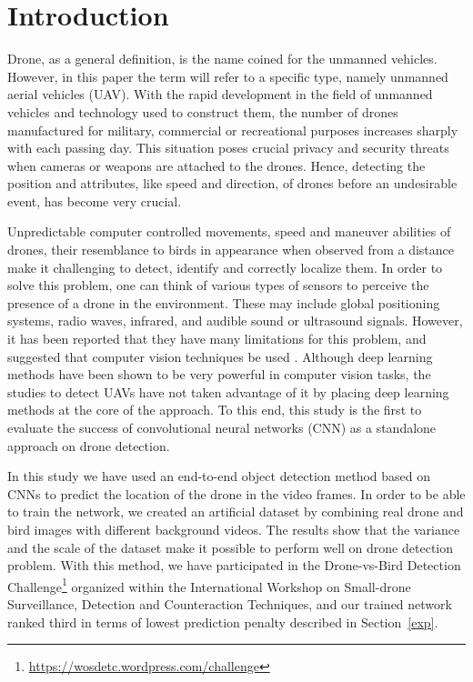 \documentclass[10pt,twocolumn,letterpaper]{article}
\begin{document}
\section{Introduction}
Drone, as a general definition, is the name coined for the unmanned vehicles. However, in this paper the term will refer to a specific type, namely unmanned aerial vehicles (UAV). With the rapid development in the field of unmanned vehicles and technology used to construct them, the number of drones manufactured for military, commercial or recreational purposes increases sharply with each passing day. This situation poses crucial privacy and security threats when cameras or weapons are attached to the drones. Hence, detecting the position and attributes, like speed and direction, of drones before an undesirable event, has become very crucial.
\par
Unpredictable computer controlled movements, speed and maneuver abilities of drones, their resemblance to birds in appearance when observed from a distance make it challenging to detect, identify and correctly localize them. In order to solve this problem, one can think of various types of sensors to perceive the presence of a drone in the environment. These may include global positioning systems, radio waves, infrared, and audible sound or ultrasound signals. However, it has been reported that they have many limitations for this problem, and suggested that computer vision techniques be used \cite{gokcce2015vision}. Although deep learning methods have been shown to be very powerful in computer vision tasks, the studies to detect UAVs have not taken advantage of it by placing deep learning methods at the core of the approach. To this end, this study is the first to evaluate the success of convolutional neural networks (CNN) as a standalone approach on drone detection.
\par
In this study we have used an end-to-end object detection method based on CNNs to predict the location of the drone in the video frames. In order to be able to train the 
network, we created an artificial dataset by combining real drone and bird images with different background videos. The results show that the variance and the scale of the dataset make it possible to perform well on drone detection problem. With this method, we have participated in the Drone-vs-Bird Detection Challenge\footnote{\url{https://wosdetc.wordpress.com/challenge}} organized within the International Workshop on Small-drone
Surveillance, Detection and Counteraction Techniques, and our trained network ranked third in terms of lowest prediction penalty described in Section~\ref{exp}.
\end{document}
